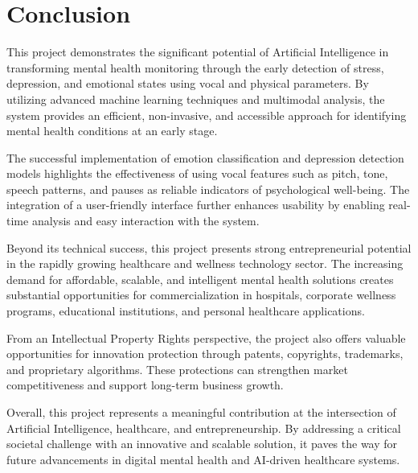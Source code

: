 
\chapter{Conclusion}

This project demonstrates the significant potential of Artificial Intelligence in transforming mental health monitoring through the early detection of stress, depression, and emotional states using vocal and physical parameters. By utilizing advanced machine learning techniques and multimodal analysis, the system provides an efficient, non-invasive, and accessible approach for identifying mental health conditions at an early stage.

The successful implementation of emotion classification and depression detection models highlights the effectiveness of using vocal features such as pitch, tone, speech patterns, and pauses as reliable indicators of psychological well-being. The integration of a user-friendly interface further enhances usability by enabling real-time analysis and easy interaction with the system.

Beyond its technical success, this project presents strong entrepreneurial potential in the rapidly growing healthcare and wellness technology sector. The increasing demand for affordable, scalable, and intelligent mental health solutions creates substantial opportunities for commercialization in hospitals, corporate wellness programs, educational institutions, and personal healthcare applications.

From an Intellectual Property Rights perspective, the project also offers valuable opportunities for innovation protection through patents, copyrights, trademarks, and proprietary algorithms. These protections can strengthen market competitiveness and support long-term business growth.

Overall, this project represents a meaningful contribution at the intersection of Artificial Intelligence, healthcare, and entrepreneurship. By addressing a critical societal challenge with an innovative and scalable solution, it paves the way for future advancements in digital mental health and AI-driven healthcare systems.
